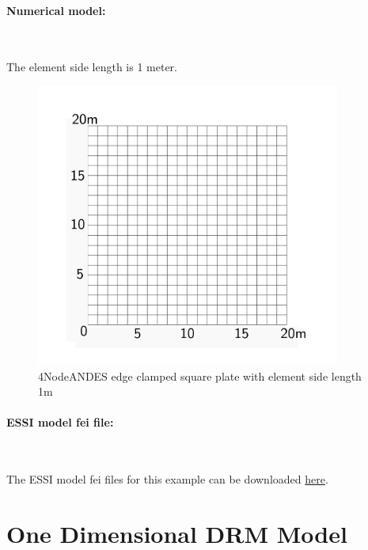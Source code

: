 \documentclass[fleqn,11pt]{article}
\begin{document}
\newpage
\paragraph{Numerical model:} ~

The element side length is 1 meter. 


\begin{figure}[H]
  \centering
  \includegraphics[width=10cm]{../Figure-files/square_plate4_2.pdf}
  \caption{4NodeANDES edge clamped square plate with element side length 1m }
  \label{fig 4NodeANDES edges clamped square plate with element side length 1m }
\end{figure}


\paragraph{ESSI model fei file: } ~




The ESSI model fei files for this example can be downloaded \href{https://github.com/BorisJeremic/Real-ESSI-Examples/blob/master/model_fei_file/ANDESshell_square_plate/ANDESshell_square_plate.tgz?raw=true}{here}.




















\newpage
\section{One Dimensional DRM Model}
\end{document}
